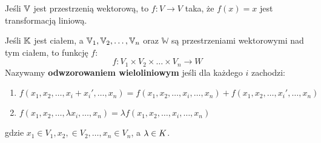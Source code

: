 \begin{example}
    Jeśli \(\mathbb{V}\) jest przestrzenią wektorową, to \(f: V \rightarrow V\) taka, że \(f(x) = x\) jest transformacją liniową.
\end{example}


\begin{definition}
    Jeśli \(\mathbb{K}\) jest ciałem, a \(\mathbb{V}_1, \mathbb{V}_2, \dots, \mathbb{V}_n\) oraz \(\mathbb{W}\) są przestrzeniami wektorowymi nad tym ciałem, to funkcję \(f\):
    \[
        f: V_1 \times V_2 \times \dots \times V_n \rightarrow W
    \]
    Nazywamy \textbf{odwzorowaniem wieloliniowym} jeśli dla każdego \(i\) zachodzi: 
    
    \begin{enumerate}
        \item \( f(x_1, x_2, \dots, x_i + x_{i}', \dots, x_n) = f(x_1, x_2, \dots, x_i, \dots, x_n) + f(x_1, x_2, \dots, x_{i}', \dots, x_n) \)
        \item \( f(x_1, x_2, \dots, \lambda x_i, \dots, x_n) = \lambda f(x_1, x_2, \dots, x_i, \dots, x_n) \)
    \end{enumerate}
    
    gdzie \(x_1 \in V_1, x_2, \in V_2, \dots, x_n \in V_n\), a \(\lambda \in K\). 
\end{definition}